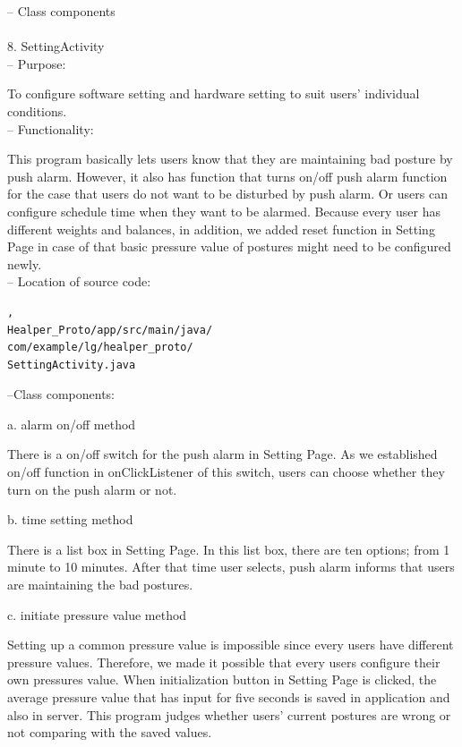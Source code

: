 \documentclass[conference]{IEEEtran}
\begin{document}
 -- Class components\\\\
 
8.	SettingActivity\\

 --	Purpose:

To configure software setting and hardware setting to suit users' individual conditions. \\

 --	Functionality:

This program basically lets users know that they are maintaining bad posture by push alarm. However, it also has  function that turns on/off push alarm function for the case that users do not want to be disturbed by push alarm. Or users can configure schedule time when they want to be alarmed. Because every user has different weights and balances, in addition, we added reset function in Setting Page in case of that basic pressure value of postures might need to be configured newly. \\

 -- Location of source code:

\begin{verbatim}, 
Healper_Proto/app/src/main/java/
com/example/lg/healper_proto/
SettingActivity.java
\end{verbatim}

 --Class components:

a.	alarm on/off method

There is a on/off switch for the push alarm in Setting Page. As we established on/off function in onClickListener of this switch, users can choose whether they turn on the push alarm or not.

b. time setting method

There is a list box in Setting Page. In this list box, there are ten options; from 1 minute to 10 minutes. After that time user selects, push alarm informs that users are maintaining the bad postures.
 
c. initiate pressure value method

Setting up a common pressure value is impossible since every users have different pressure values. Therefore, we made it possible that every users configure their own pressures value. When initialization button in Setting Page is clicked, the average pressure value that has input for five seconds is saved in application and also in server. This program judges whether users' current postures are wrong or not comparing with the saved values. 
\end{document}
